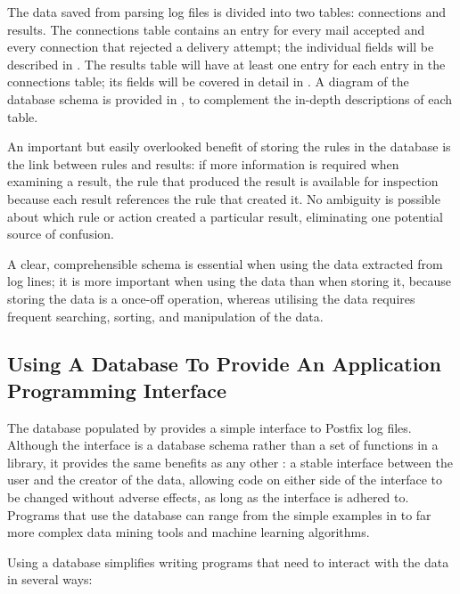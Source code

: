 The data saved from parsing log files is divided into two tables:
connections and results.  The connections table contains an entry for every
mail accepted and every connection that rejected a delivery attempt; the
individual fields will be described in .  The
results table will have at least one entry for each entry in the
connections table; its fields will be covered in detail in
.  A diagram of the database schema is provided
in , to complement the
in-depth descriptions of each table.

An important but easily overlooked benefit of storing the rules in the
database is the link between rules and results: if more information is
required when examining a result, the rule that produced the result is
available for inspection because each result references the rule that
created it.  No ambiguity is possible about which rule or action created a
particular result, eliminating one potential source of confusion.

A clear, comprehensible schema is essential when using the data extracted
from log lines; it is more important when using the data than when storing
it, because storing the data is a once-off operation, whereas utilising
the data requires frequent searching, sorting, and manipulation of the
data.

\subsection{Using A Database To Provide An Application Programming Interface}

\label{database as API}

The database populated by \parsername{} provides a simple interface to
Postfix log files.  Although the interface is a database schema rather than
a set of functions in a library, it provides the same benefits as any other
: a stable interface between the user and the creator of the
data, allowing code on either side of the interface to be changed without
adverse effects, as long as the interface is adhered to.  Programs that use
the database can range from the simple examples in 
to far more complex data mining tools and machine learning algorithms.

Using a database simplifies writing programs that need to interact with the
data in several ways:

